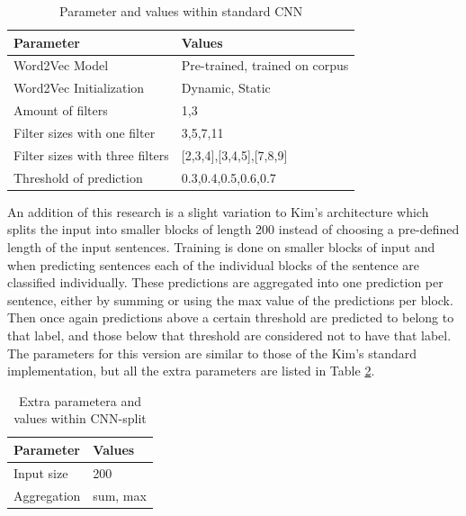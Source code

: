 \begin{table}[H]
\centering
\caption{Parameter and values within standard CNN}
\label{ParametersCNN}
\begin{tabular}{@{}ll@{}}
\toprule
\textbf{Parameter}      	& \textbf{Values}                             			\\ \midrule
Word2Vec Model          	& Pre-trained, trained on corpus              		\\
Word2Vec Initialization 	& Dynamic, Static                            			\\
Amount of filters       	& 1,3                                        				\\
Filter sizes with one filter 	& 3,5,7,11						 	\\
Filter sizes with three filters& [2,3,4],[3,4,5],[7,8,9]				 	\\
Threshold of prediction	& 0.3,0.4,0.5,0.6,0.7                         			\\ \bottomrule
\end{tabular}
\end{table}

An addition of this research is a slight variation to Kim's architecture which splits the input into smaller blocks of length 200 instead of choosing a pre-defined length of the input sentences. Training is done on smaller blocks of input and when predicting sentences each of the individual blocks of the sentence are classified individually. These predictions are aggregated into one prediction per sentence, either by summing or using the max value of the predictions per block. Then once again predictions above a certain threshold are predicted to belong to that label, and those below that threshold are considered not to have that label. The parameters for this version are similar to those of the Kim's standard implementation, but all the extra parameters are listed in Table \ref{ParametersCNNSplit}.

\begin{table}[H]
\centering
\caption{Extra parametera and values within CNN-split}
\label{ParametersCNNSplit}
\begin{tabular}{@{}ll@{}}
\toprule
\textbf{Parameter}      	& \textbf{Values}                             			\\ \midrule
Input size              		& 200			                               			\\
Aggregation             	& sum, max                                    			\\
\end{tabular}
\end{table}



